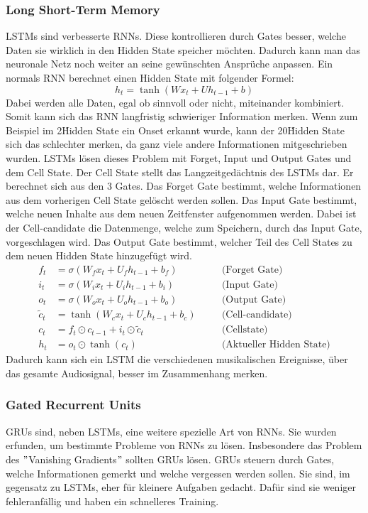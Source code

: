 \subsubsection{Long Short-Term Memory}
LSTMs sind verbesserte RNNs.
Diese kontrollieren durch Gates besser, welche Daten sie wirklich in den Hidden State speicher möchten.
Dadurch kann man das neuronale Netz noch weiter an seine gewünschten Ansprüche anpassen.
Ein normals RNN berechnet einen Hidden State mit folgender Formel:
\begin{equation*}
h_t = \tanh(W x_t + U h_{t-1} + b)
\end{equation*}
Dabei werden alle Daten, egal ob sinnvoll oder nicht, miteinander kombiniert.
Somit kann sich das RNN langfristig schwieriger Information merken.
Wenn zum Beispiel im 2\. Hidden State ein Onset erkannt wurde, kann der 20\. Hidden State
sich das schlechter merken, da ganz viele andere Informationen mitgeschrieben wurden.
LSTMs lösen dieses Problem mit Forget, Input und Output Gates und dem Cell State.
Der Cell State stellt das Langzeitgedächtnis des LSTMs dar.
Er berechnet sich aus den 3 Gates.
Das Forget Gate bestimmt, welche Informationen aus dem vorherigen Cell State gelöscht werden sollen.
Das Input Gate bestimmt, welche neuen Inhalte aus dem neuen Zeitfenster aufgenommen werden.
Dabei ist der Cell-candidate die Datenmenge, welche zum Speichern, durch das Input Gate, vorgeschlagen wird.
Das Output Gate bestimmt, welcher Teil des Cell States zu dem neuen Hidden State hinzugefügt wird.
\begin{align*}
f_t &= \sigma(W_f x_t + U_f h_{t-1} + b_f) \quad &&\text{(Forget Gate)} \\
i_t &= \sigma(W_i x_t + U_i h_{t-1} + b_i) \quad &&\text{(Input Gate)} \\
o_t &= \sigma(W_o x_t + U_o h_{t-1} + b_o) \quad &&\text{(Output Gate)} \\
\tilde{c}_t &= \tanh(W_c x_t + U_c h_{t-1} + b_c) \quad &&\text{(Cell-candidate)} \\
c_t &= f_t \odot c_{t-1} + i_t \odot \tilde{c}_t \quad &&\text{(Cellstate)} \\
h_t &= o_t \odot \tanh(c_t) \quad &&\text{(Aktueller Hidden State)}
\end{align*}
Dadurch kann sich ein LSTM die verschiedenen musikalischen Ereignisse,
über das gesamte Audiosignal, besser im Zusammenhang merken.

\subsubsection{Gated Recurrent Units}
GRUs sind, neben LSTMs, eine weitere spezielle Art von RNNs.
\cite{chung2014empirical}
Sie wurden erfunden, um bestimmte Probleme von RNNs zu lösen.
Insbesondere das Problem des \("\)Vanishing Gradients\("\) sollten GRUs lösen.
GRUs steuern durch Gates, welche Informationen gemerkt und welche vergessen werden sollen.
Sie sind, im gegensatz zu LSTMs, eher für kleinere Aufgaben gedacht.
Dafür sind sie weniger fehleranfällig und haben ein schnelleres Training.

